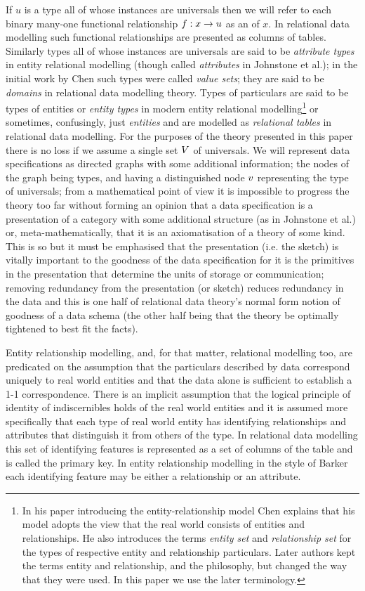 If $u$ is a type all of whose instances are universals then we will refer to each binary many-one functional relationship $f: x \rightarrow u$ as an  of $x$. In relational data modelling such functional relationships are presented as columns of tables. Similarly types all of whose instances are universals  are said to be \textit{attribute types} in entity relational modelling  (though called \textit{attributes} in Johnstone et al.); in the initial work by  Chen such types were called \textit{value sets}; they are said to be \textit{domains} in relational data modelling theory. Types of particulars are said to be types of entities or \textit{entity types} in modern entity relational modelling\footnote{In  his paper  introducing the entity-relationship model Chen explains that his model adopts the view that the real world consists of entities and relationships. He also introduces the  terms \textit{entity set} and \textit{relationship set} for the types of respective entity and relationship particulars. Later authors kept the terms entity and relationship, and the philosophy, but changed the way that they were used. In this paper we use the later terminology.} or sometimes, confusingly, just \textit{entities}  and are modelled as \textit{relational tables} in relational data modelling. For the purposes of the theory presented in this paper there is no loss if we assume a single set $V$ of universals.  We will represent data specifications as directed graphs with some additional information; the nodes of the graph being types, and having a distinguished node $v$ representing the type of universals; from a mathematical point of view it is impossible to progress the theory too far without forming an opinion that a data specification is a presentation of a category with some additional structure (as in Johnstone et al.) or, meta-mathematically, that it is an axiomatisation of a theory of some kind. This is so but it must be emphasised that the presentation (i.e. the sketch) is vitally important to the goodness of the data specification for it is the primitives in the presentation that determine the units of storage or communication; removing redundancy from the presentation (or sketch) reduces redundancy in the data and this is one half of relational data theory's  normal form notion of goodness of a data schema (the other half being that the theory be optimally tightened to best fit the facts).

Entity relationship modelling, and, for that matter, relational modelling too, are predicated on the assumption that the particulars described by data correspond uniquely to real world entities and that the data alone is sufficient to establish a 1-1 correspondence. There is an implicit assumption that the logical principle of identity of indiscernibles holds of the real world entities and it is assumed more specifically that each type of real world entity has identifying relationships and attributes that distinguish it from  others of the type. In relational data modelling this set of identifying features is represented as a set of columns of the table and is called the primary key. In entity relationship modelling in the style of Barker each identifying feature may be either a relationship or an attribute.   


